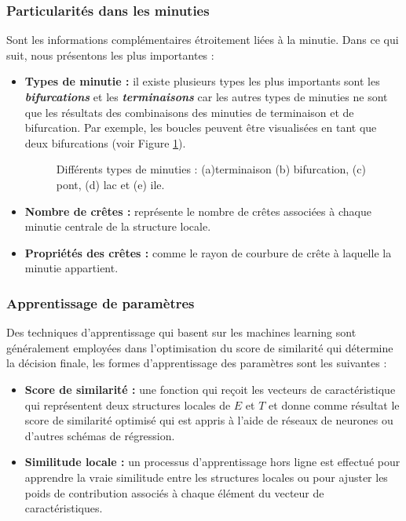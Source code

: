 \subsubsection{Particularités dans les minuties}
Sont les informations complémentaires étroitement liées à la minutie. Dans ce qui suit, nous présentons les plus importantes :
\begin{itemize}
	\item \textbf{Types de minutie :} il existe plusieurs types les plus importants sont les \textit{\textbf{bifurcations}} et les \textit{\textbf{terminaisons}} car les autres types de minuties ne sont que les résultats des combinaisons des minuties de terminaison et de bifurcation. Par exemple, les boucles peuvent être visualisées en tant que deux bifurcations (voir  Figure \ref{fig:chapitre2types}). 
	\begin{center}
		\begin{figure}[H]
			\centering
			\caption{Différents types de minuties : (a)terminaison (b) bifurcation, (c) pont, (d) lac et (e) ile.}
			\label{fig:chapitre2types}
		\end{figure}
	\end{center}
	\item\textbf{Nombre de crêtes :} représente le nombre de crêtes associées à chaque minutie centrale de la structure locale.
	\item \textbf{Propriétés des crêtes :} comme le rayon de courbure de crête à laquelle la minutie appartient.
\end{itemize}
\subsubsection{Apprentissage de paramètres }
Des techniques d'apprentissage qui basent sur les machines learning sont généralement employées dans l'optimisation du score de similarité qui détermine la décision finale, les formes d'apprentissage des paramètres sont les suivantes :
\begin{itemize}
	\item \textbf{Score de similarité :} une fonction qui reçoit les vecteurs de caractéristique qui représentent deux structures locales de $ E $ et $ T $ et donne comme résultat le score de similarité optimisé qui est appris à l'aide de réseaux de neurones ou d'autres schémas de régression.
	\item \textbf{Similitude locale :} un processus d'apprentissage hors ligne est effectué pour apprendre la vraie similitude entre les structures locales ou pour ajuster les poids de contribution associés à chaque élément du vecteur de caractéristiques.	
\end{itemize}
